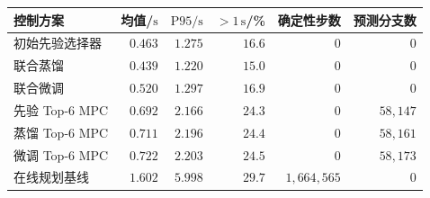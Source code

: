 \begin{table}[!htbp]
\centering
{}
\label{tab:ch5-dynamic-cost}
\begin{tabular}{lrrrrr}
\toprule
控制方案 & 均值/$\mathrm{s}$ & $\mathrm{P95}/\mathrm{s}$ & $>1\,\mathrm{s}$/\% & 确定性步数 & 预测分支数 \\
\midrule
初始先验选择器 & $0.463$ & $1.275$ & $16.6$ & $0$ & $0$ \\
联合蒸馏 & $0.439$ & $1.220$ & $15.0$ & $0$ & $0$ \\
联合微调 & $0.520$ & $1.297$ & $16.9$ & $0$ & $0$ \\
先验 Top-6 MPC & $0.692$ & $2.166$ & $24.3$ & $0$ & $58,147$ \\
蒸馏 Top-6 MPC & $0.711$ & $2.196$ & $24.4$ & $0$ & $58,161$ \\
微调 Top-6 MPC & $0.722$ & $2.203$ & $24.5$ & $0$ & $58,173$ \\
在线规划基线 & $1.602$ & $5.998$ & $29.7$ & $1,664,565$ & $0$ \\
\bottomrule
\end{tabular}
\end{table}
